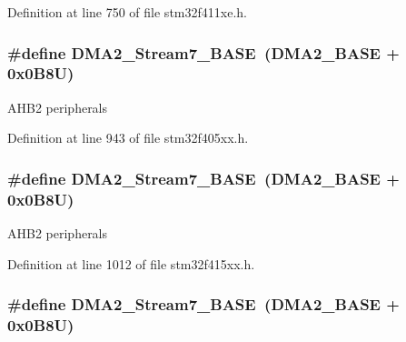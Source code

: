 Definition at line 750 of file stm32f411xe.\+h.

\subsubsection[{\texorpdfstring{D\+M\+A2\+\_\+\+Stream7\+\_\+\+B\+A\+SE}{DMA2_Stream7_BASE}}]{\setlength{\rightskip}{0pt plus 5cm}\#define D\+M\+A2\+\_\+\+Stream7\+\_\+\+B\+A\+SE~({\bf D\+M\+A2\+\_\+\+B\+A\+SE} + 0x0\+B8\+U)}\hypertarget{group___peripheral__registers__structures_gaa9faa708ad2440d24eb1064cba9bb06d}{}\label{group___peripheral__registers__structures_gaa9faa708ad2440d24eb1064cba9bb06d}
A\+H\+B2 peripherals 

Definition at line 943 of file stm32f405xx.\+h.

\subsubsection[{\texorpdfstring{D\+M\+A2\+\_\+\+Stream7\+\_\+\+B\+A\+SE}{DMA2_Stream7_BASE}}]{\setlength{\rightskip}{0pt plus 5cm}\#define D\+M\+A2\+\_\+\+Stream7\+\_\+\+B\+A\+SE~({\bf D\+M\+A2\+\_\+\+B\+A\+SE} + 0x0\+B8\+U)}\hypertarget{group___peripheral__registers__structures_gaa9faa708ad2440d24eb1064cba9bb06d}{}\label{group___peripheral__registers__structures_gaa9faa708ad2440d24eb1064cba9bb06d}
A\+H\+B2 peripherals 

Definition at line 1012 of file stm32f415xx.\+h.

\subsubsection[{\texorpdfstring{D\+M\+A2\+\_\+\+Stream7\+\_\+\+B\+A\+SE}{DMA2_Stream7_BASE}}]{\setlength{\rightskip}{0pt plus 5cm}\#define D\+M\+A2\+\_\+\+Stream7\+\_\+\+B\+A\+SE~({\bf D\+M\+A2\+\_\+\+B\+A\+SE} + 0x0\+B8\+U)}\hypertarget{group___peripheral__registers__structures_gaa9faa708ad2440d24eb1064cba9bb06d}{}\label{group___peripheral__registers__structures_gaa9faa708ad2440d24eb1064cba9bb06d}


